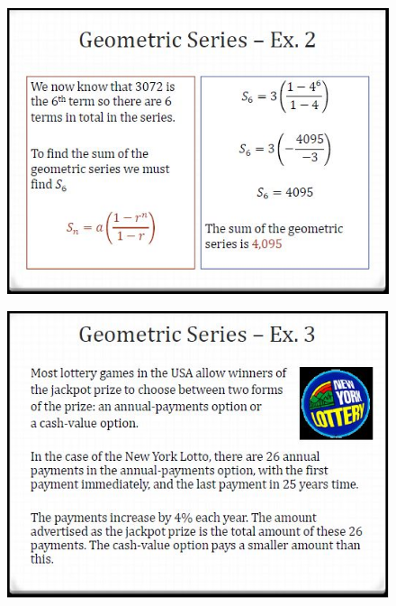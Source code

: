 \documentclass{beamer}
\begin{document}
\begin{frame}
	\begin{figure}
		\centering
		\includegraphics[width=0.99\linewidth]{SeqSer20A}
	\end{figure}
	
\end{frame}	
\begin{frame}
	\begin{figure}
		\centering
		\includegraphics[width=0.99\linewidth]{SeqSer20B}
	\end{figure}
	
\end{frame}
\end{document}
